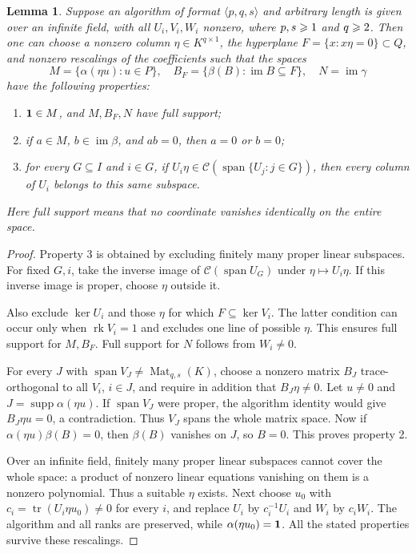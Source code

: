 \documentclass[11pt,a4paper]{article}
\numberwithin{equation}{section}
\theoremstyle{plain}
\newtheorem{lemma}[theorem]{Lemma}
\theoremstyle{definition}
\DeclareMathOperator{\tr}{tr}\DeclareMathOperator{\rk}{rk}
\DeclareMathOperator{\im}{im}\DeclareMathOperator{\supp}{supp}
\DeclareMathOperator{\Mat}{Mat}\DeclareMathOperator{\Span}{span}
\newcommand{\col}{\mathcal C}\newcommand{\test}{\mathcal T}
\begin{document}
\begin{lemma}\label{lem:generic}
Suppose an algorithm of format $\langle p,q,s\rangle$ and arbitrary
length is given over an infinite field, with all $U_i,V_i,W_i$ nonzero,
where $p,s\geqslant1$ and $q\geqslant2$. Then one can choose a nonzero column
$\eta\in K^{q\times1}$, the hyperplane
$F=\{x:x\eta=0\}\subset Q$, and nonzero rescalings of the coefficients
such that the spaces
\[
 M=\{\alpha(\eta u):u\in P\},\quad
 B_F=\{\beta(B):\im B\subseteq F\},\quad N=\im\gamma
\]
have the following properties:
\begin{enumerate}
\item $\mathbf1\in M$, and $M,B_F,N$ have full support;
\item if $a\in M$, $b\in\im\beta$, and $ab=0$, then $a=0$ or $b=0$;
\item for every $G\subseteq I$ and $i\in G$, if
$U_i\eta\in\col(\Span\{U_j:j\in G\})$, then every column of $U_i$
belongs to this same subspace.
\end{enumerate}
Here full support means that no coordinate vanishes identically on
the entire space.
\end{lemma}
\begin{proof}
Property 3 is obtained by excluding finitely many proper linear
subspaces. For fixed $G,i$, take the inverse image of
$\col(\Span U_G)$ under $\eta\mapsto U_i\eta$. If this inverse image
is proper, choose $\eta$ outside it.

Also exclude $\ker U_i$ and those $\eta$ for which
$F\subseteq\ker V_i$. The latter condition can occur only when
$\rk V_i=1$ and excludes one line of possible $\eta$.
This ensures full support for $M,B_F$. Full support for $N$ follows
from $W_i\ne0$.

For every $J$ with $\Span V_J\ne\Mat_{q,s}(K)$, choose a nonzero
matrix $B_J$ trace-orthogonal to all $V_i$, $i\in J$, and require
in addition that $B_J\eta\ne0$.
Let $u\ne0$ and $J=\supp\alpha(\eta u)$. If $\Span V_J$ were proper,
the algorithm identity would give $B_J\eta u=0$, a contradiction.
Thus $V_J$ spans the whole matrix space. Now if
$\alpha(\eta u)\beta(B)=0$, then $\beta(B)$ vanishes on $J$, so $B=0$.
This proves property 2.

Over an infinite field, finitely many proper linear subspaces cannot
cover the whole space: a product of nonzero linear equations vanishing
on them is a nonzero polynomial. Thus a suitable $\eta$ exists.
Next choose $u_0$ with $c_i=\tr(U_i\eta u_0)\ne0$ for every $i$,
and replace $U_i$ by $c_i^{-1}U_i$ and $W_i$ by $c_iW_i$.
The algorithm and all ranks are preserved, while
$\alpha(\eta u_0)=\mathbf1$. All the stated properties survive these
rescalings.
\end{proof}
\end{document}
